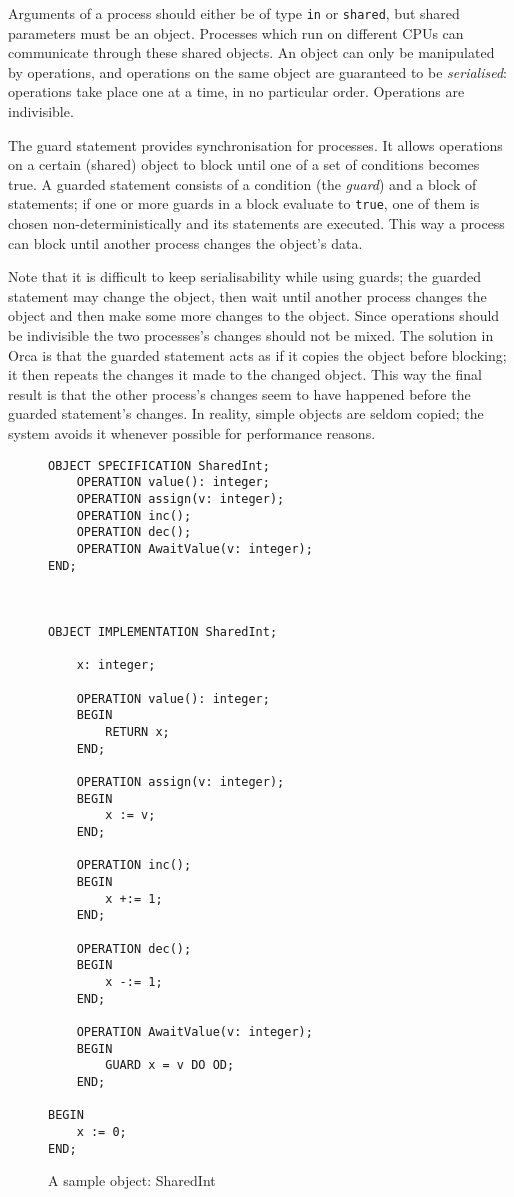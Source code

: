 Arguments of a process should either be of type {\tt in} or 
{\tt shared}, but shared parameters must be an object.
Processes which run on different CPUs can communicate through
these shared objects.
An object can only
be manipulated by operations, and operations on the same object are
guaranteed to be {\em serialised}: operations take place one at a
time, in no particular order. Operations are indivisible.

The guard statement provides synchronisation for
processes. It allows operations on a certain (shared) object to block
until one of a set of conditions becomes true. A guarded statement
consists of a condition (the {\em guard}) and a block of statements;
if one or more guards in a block evaluate to {\tt true}, one of them is
chosen non-deterministically and its statements are executed. This way
a process can block until another process changes the object's data.

Note that it is difficult to keep serialisability while using guards;
the guarded statement may change the object, then wait until another
process changes the object and then make some more changes to the
object. Since operations should be indivisible the two processes's
changes should not be mixed.
The solution in Orca is that the guarded statement acts as if
it copies the object before blocking; it then repeats the changes it
made to the changed object. This way the final result is that the
other process's changes seem to have happened before the guarded
statement's changes. In reality, simple objects are seldom copied;
the system avoids it whenever possible for performance reasons.

\begin{figure}
\begin{small}
\begin{verbatim}
OBJECT SPECIFICATION SharedInt;
    OPERATION value(): integer;
    OPERATION assign(v: integer);
    OPERATION inc();
    OPERATION dec();
    OPERATION AwaitValue(v: integer);
END;



OBJECT IMPLEMENTATION SharedInt;

    x: integer;

    OPERATION value(): integer;
    BEGIN
        RETURN x;
    END;

    OPERATION assign(v: integer);
    BEGIN
        x := v;
    END;

    OPERATION inc();
    BEGIN
        x +:= 1;
    END;

    OPERATION dec();
    BEGIN
        x -:= 1;
    END;

    OPERATION AwaitValue(v: integer);
    BEGIN
        GUARD x = v DO OD;
    END;

BEGIN
    x := 0;
END;
\end{verbatim}
\end{small}
\caption{A sample object: SharedInt}
\label{fSharedInt}
\end{figure}

